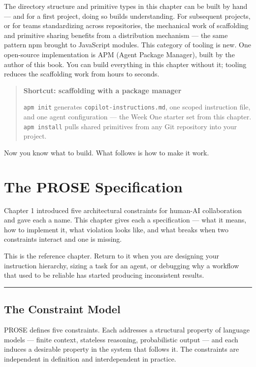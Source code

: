 \documentclass[
  a4paper,
  DIV=11,
  numbers=noendperiod]{scrreprt}
\begin{document}
The directory structure and primitive types in this chapter can be built
by hand --- and for a first project, doing so builds understanding. For
subsequent projects, or for teams standardizing across repositories, the
mechanical work of scaffolding and primitive sharing benefits from a
distribution mechanism --- the same pattern npm brought to JavaScript
modules. This category of tooling is new. One open-source implementation
is APM (Agent Package Manager), built by the author of this book. You
can build everything in this chapter without it; tooling reduces the
scaffolding work from hours to seconds.

\begin{quote}
\textbf{Shortcut: scaffolding with a package manager}

\texttt{apm\ init} generates \texttt{copilot-instructions.md}, one
scoped instruction file, and one agent configuration --- the Week One
starter set from this chapter. \texttt{apm\ install} pulls shared
primitives from any Git repository into your project.
\end{quote}

Now you know what to build. What follows is how to make it work.

\chapter{The PROSE Specification}\label{the-prose-specification}

Chapter 1 introduced five architectural constraints for human-AI
collaboration and gave each a name. This chapter gives each a
specification --- what it means, how to implement it, what violation
looks like, and what breaks when two constraints interact and one is
missing.

This is the reference chapter. Return to it when you are designing your
instruction hierarchy, sizing a task for an agent, or debugging why a
workflow that used to be reliable has started producing inconsistent
results.

\begin{center}\rule{0.5\linewidth}{0.5pt}\end{center}

\section{The Constraint Model}\label{the-constraint-model}

PROSE defines five constraints. Each addresses a structural property of
language models --- finite context, stateless reasoning, probabilistic
output --- and each induces a desirable property in the system that
follows it. The constraints are independent in definition and
interdependent in practice.
\end{document}
